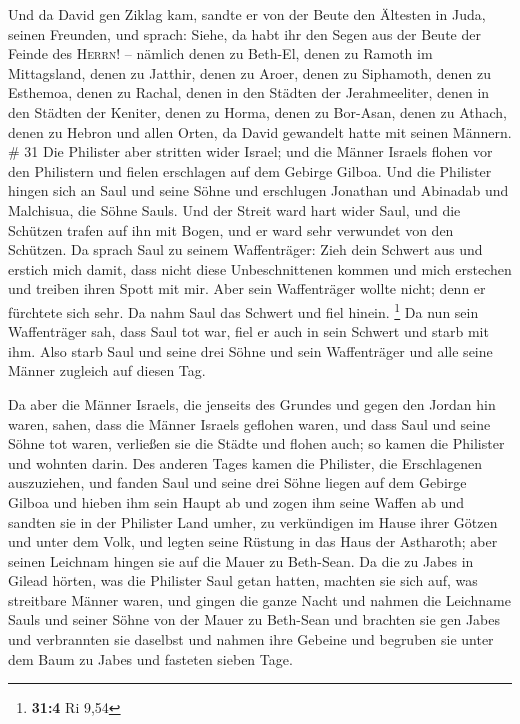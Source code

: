  Und da David gen Ziklag kam, sandte er von der Beute den
Ältesten in Juda, seinen Freunden, und sprach: Siehe, da habt ihr den
Segen aus der Beute der Feinde des \textsc{Herrn}! -- 
nämlich denen zu Beth-El, denen zu Ramoth im Mittagsland, denen zu
Jatthir,  denen zu Aroer, denen zu Siphamoth, denen zu
Esthemoa,  denen zu Rachal, denen in den Städten der
Jerahmeeliter, denen in den Städten der Keniter,  denen
zu Horma, denen zu Bor-Asan, denen zu Athach,  denen zu
Hebron und allen Orten, da David gewandelt hatte mit seinen Männern. \#
31  Die Philister aber stritten wider Israel; und die
Männer Israels flohen vor den Philistern und fielen erschlagen auf dem
Gebirge Gilboa.  Und die Philister hingen sich an Saul und
seine Söhne und erschlugen Jonathan und Abinadab und Malchisua, die
Söhne Sauls.  Und der Streit ward hart wider Saul, und die
Schützen trafen auf ihn mit Bogen, und er ward sehr verwundet von den
Schützen.  Da sprach Saul zu seinem Waffenträger: Zieh
dein Schwert aus und erstich mich damit, dass nicht diese
Unbeschnittenen kommen und mich erstechen und treiben ihren Spott mit
mir. Aber sein Waffenträger wollte nicht; denn er fürchtete sich sehr.
Da nahm Saul das Schwert und fiel hinein. \footnote{\textbf{31:4} Ri
  9,54}  Da nun sein Waffenträger sah, dass Saul tot war,
fiel er auch in sein Schwert und starb mit ihm.  Also
starb Saul und seine drei Söhne und sein Waffenträger und alle seine
Männer zugleich auf diesen Tag.

 Da aber die Männer Israels, die jenseits des Grundes und
gegen den Jordan hin waren, sahen, dass die Männer Israels geflohen
waren, und dass Saul und seine Söhne tot waren, verließen sie die Städte
und flohen auch; so kamen die Philister und wohnten darin.
 Des anderen Tages kamen die Philister, die Erschlagenen
auszuziehen, und fanden Saul und seine drei Söhne liegen auf dem Gebirge
Gilboa  und hieben ihm sein Haupt ab und zogen ihm seine
Waffen ab und sandten sie in der Philister Land umher, zu verkündigen im
Hause ihrer Götzen und unter dem Volk,  und legten seine
Rüstung in das Haus der Astharoth; aber seinen Leichnam hingen sie auf
die Mauer zu Beth-Sean.  Da die zu Jabes in Gilead
hörten, was die Philister Saul getan hatten,  machten sie
sich auf, was streitbare Männer waren, und gingen die ganze Nacht und
nahmen die Leichname Sauls und seiner Söhne von der Mauer zu Beth-Sean
und brachten sie gen Jabes und verbrannten sie daselbst 
und nahmen ihre Gebeine und begruben sie unter dem Baum zu Jabes und
fasteten sieben Tage.
